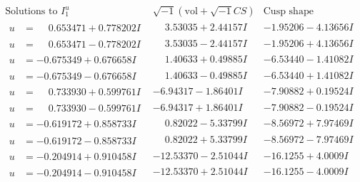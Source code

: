 \documentclass[1p]{elsarticle_modified}
\theoremstyle{definition}
\newcommand{\I}{\sqrt{-1}}
\begin{document}
$$\begin{array}{c|c|c}  
\text{Solutions to }I^u_{1}& \I (\text{vol} + \sqrt{-1}CS) & \text{Cusp shape}\\
 \hline 
\begin{aligned}
u &= \phantom{-}0.653471 + 0.778202 I\end{aligned}
 & \phantom{-}3.53035 + 2.44157 I & -1.95206 - 4.13656 I \\ \hline\begin{aligned}
u &= \phantom{-}0.653471 - 0.778202 I\end{aligned}
 & \phantom{-}3.53035 - 2.44157 I & -1.95206 + 4.13656 I \\ \hline\begin{aligned}
u &= -0.675349 + 0.676658 I\end{aligned}
 & \phantom{-}1.40633 + 0.49885 I & -6.53440 - 1.41082 I \\ \hline\begin{aligned}
u &= -0.675349 - 0.676658 I\end{aligned}
 & \phantom{-}1.40633 - 0.49885 I & -6.53440 + 1.41082 I \\ \hline\begin{aligned}
u &= \phantom{-}0.733930 + 0.599761 I\end{aligned}
 & -6.94317 - 1.86401 I & -7.90882 + 0.19524 I \\ \hline\begin{aligned}
u &= \phantom{-}0.733930 - 0.599761 I\end{aligned}
 & -6.94317 + 1.86401 I & -7.90882 - 0.19524 I \\ \hline\begin{aligned}
u &= -0.619172 + 0.858733 I\end{aligned}
 & \phantom{-}0.82022 - 5.33799 I & -8.56972 + 7.97469 I \\ \hline\begin{aligned}
u &= -0.619172 - 0.858733 I\end{aligned}
 & \phantom{-}0.82022 + 5.33799 I & -8.56972 - 7.97469 I \\ \hline\begin{aligned}
u &= -0.204914 + 0.910458 I\end{aligned}
 & -12.53370 - 2.51044 I & -16.1255 + 4.0009 I \\ \hline\begin{aligned}
u &= -0.204914 - 0.910458 I\end{aligned}
 & -12.53370 + 2.51044 I & -16.1255 - 4.0009 I \\ \hline\begin{aligned}

\end{aligned}
\end{array}$$
\end{document}
